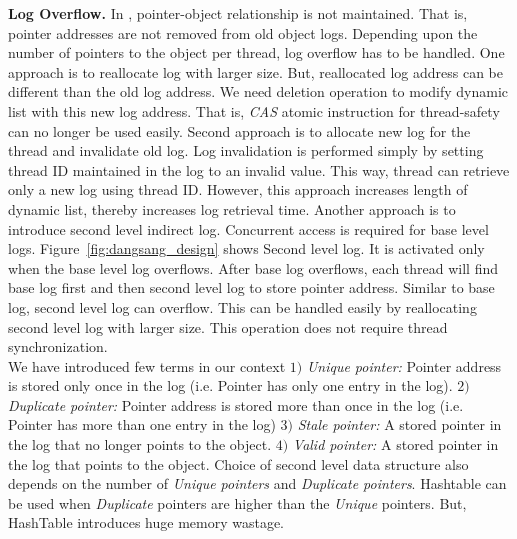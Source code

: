 \textbf{Log Overflow.} 
 In \projectname{}, pointer-object relationship is not maintained. That is, pointer addresses are not removed from old object logs. Depending upon the number of pointers to the object per thread, log overflow has to be handled. One approach is to reallocate log with larger size. But, reallocated log address can be different than the old log address. We need deletion operation to modify dynamic list with this new log address. That is, \emph{CAS} atomic instruction for thread-safety can no longer be used easily. Second approach is to allocate new log for the thread and invalidate old log. Log invalidation is performed simply by setting thread ID maintained in the log to an invalid value. This way, thread can retrieve only a new log using thread ID. However, this approach increases length of dynamic list, thereby increases log retrieval time. Another approach is to introduce second level indirect log. Concurrent access is required for base level logs. Figure~\ref{fig:dangsang_design} shows Second level log. It is activated only when the base level log overflows. After base log overflows, each thread will find base log first and then second level log to store  pointer address. %
Similar to base log, second level log can overflow. This can be handled easily by reallocating second level log with larger size. This operation does not require thread synchronization.  \\

We have introduced few terms in our context $1)$ \textit{Unique pointer:}  Pointer address is stored only once in the log (i.e. Pointer has only one entry in the log). $2)$ \textit{Duplicate pointer:} Pointer address is stored more than once in the log (i.e. Pointer has more than one entry in the log) $3)$ \textit{Stale pointer:} A stored pointer in the log that no longer points to the object. $4)$ \textit{Valid pointer:} A stored pointer in the log that points to the object. Choice of second level data structure also depends on the number of \textit{Unique pointers} and \textit{Duplicate pointers}. Hashtable can be used when \textit{Duplicate} pointers are higher than the \textit{Unique} pointers. But, HashTable introduces huge memory wastage.\\


